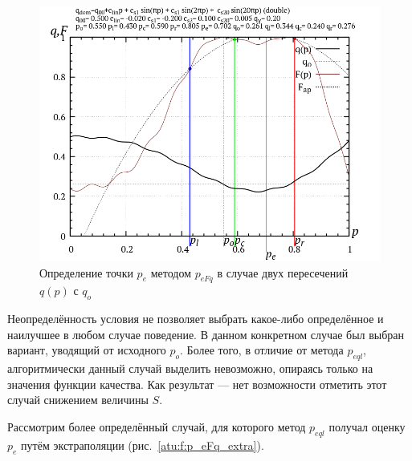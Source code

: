 \begin{figure}[htb!]
  \centerline{\includegraphics[width=60\TW]{p/p_eFq/q_p_eFq_double.png}}
  \caption{Определение точки $p_e$ методом $p_{eFq}$ в случае двух пересечений $q(p)$ с $q_o$ }
  \label{atu:f:p_eFq_double}
\end{figure}

Неопределённость условия не позволяет выбрать какое-либо определённое и
наилучшее в любом случае поведение. В данном конкретном случае
был выбран вариант, уводящий от исходного $p_o$.
Более того, в отличие от метода $p_{eql}$,
алгоритмически данный случай выделить невозможно, опираясь только на значения
функции качества. Как результат --- нет возможности отметить этот случай снижением
величины $S$.

Рассмотрим более определённый случай, для которого метод $p_{eql}$
получал оценку $p_e$ путём экстраполяции (рис.~\ref{atu:f:p_eFq_extra}).

